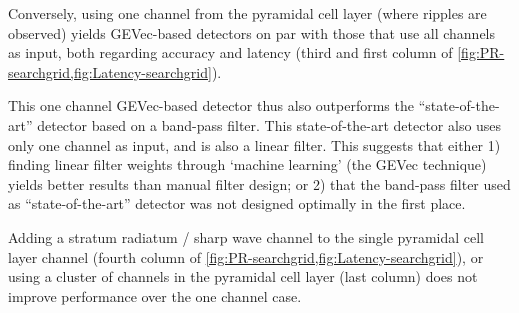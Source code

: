 Conversely, using one channel from the pyramidal cell layer (where ripples are observed) yields GEVec-based detectors on par with those that use all channels as input, both regarding accuracy and latency (third and first column of \cref{fig:PR-searchgrid,fig:Latency-searchgrid}).

This one channel GEVec-based detector thus also outperforms the ``state-of-the-art'' detector based on a band-pass filter. This state-of-the-art detector also uses only one channel as input, and is also a linear filter. This suggests that either 1) finding linear filter weights through `machine learning' (the GEVec technique) yields better results than manual filter design; or 2) that the band-pass filter used as ``state-of-the-art'' detector was not designed optimally in the first place.

Adding a stratum radiatum / sharp wave channel to the single pyramidal cell layer channel (fourth column of \cref{fig:PR-searchgrid,fig:Latency-searchgrid}), or using a cluster of channels in the pyramidal cell layer (last column) does not improve performance over the one channel case.
